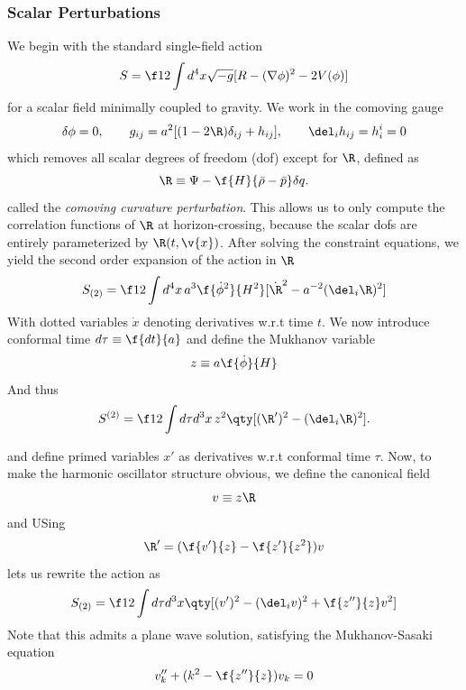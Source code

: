 \subsubsection{Scalar Perturbations}
We begin with the standard single-field action 
\begin{equation}
    \label{eq:stdsinglefield}
    S=\f12 \int d^4x \sqrt{-g} [R -(\nabla\phi)^2-2V(\phi)]
\end{equation}
for a scalar field minimally coupled to gravity. We work in the comoving gauge
\begin{equation}
    \label{eq:gauges}
    \delta\phi=0, \qquad g_{ij}=a^2[(1-2\R )\delta_{ij}+h_{ij}], \qquad \del_ih_{ij}=h^i_i=0
\end{equation}
which removes all scalar degrees of freedom (dof) except for $\R $, defined as
\begin{equation}
    \R \equiv \Psi-\f{H}{\Bar{\rho}-\Bar{p}}\delta q.
\end{equation}
called the \textit{comoving curvature perturbation}. This allows us to only compute the correlation functions of $\R $ at horizon-crossing, because the scalar dofs are entirely parameterized by $\R (t,\v{x})$. After solving the constraint equations, we yield the second order expansion of the action in $\R$
\begin{equation}
    \label{eq:secorderstdaction}
    S_{(2)}=\f12 \int d^4x\, a^3 \f{\dot \phi^2}{H^2}[\dot{\R }^2-a^{-2}(\del_i \R )^2]
\end{equation}
With dotted variables $\dot{x}$ denoting derivatives w.r.t time $t$. We now introduce conformal time $d\tau\equiv \f{dt}{a}$ and define the Mukhanov variable
\begin{equation}
    z\equiv a\f{\dot{\phi}}{H}
\end{equation}
And thus
\begin{equation}
    S^{(2)}=\f12\int d\tau d^3x\,z^2  
\qty[(\R')^2-(\del_i \R)^2].  
\end{equation}

and define primed variables $x'$ as derivatives w.r.t conformal time $\tau$. Now, to make the harmonic oscillator structure obvious, we define the canonical field
\begin{equation}
    v\equiv z\R
\end{equation}
and USing
\begin{equation}
    \R'=(\f{v'}{z}-\f{z'}{z^2})v
\end{equation}
 lets us rewrite the action as
\begin{equation}
S_{(2)} = \f12 \int d\tau d^3x
\qty[(v')^2 - (\del_i v)^2 + \f{z''}{z} v^2]
\end{equation}
Note that this admits a plane wave solution, satisfying the Mukhanov-Sasaki equation
\begin{equation}
    v_k''+(k^2-\f{z''}{z})v_k=0
\end{equation}

